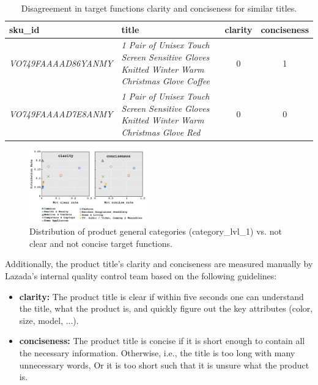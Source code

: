 \documentclass[sigconf]{acmart}
\begin{document}
\begin{table}[t]
\small
\centering
\caption{Disagreement in target functions clarity and conciseness for similar titles.}
\label{tbl:noise}
\begin{tabular}{ll|cc}
\hline
\textbf{sku\_id} & \textbf{title}                                                                & \textbf{clarity} & \textbf{conciseness} \\ \hline
\textit{VO749FAAAAD86YANMY}          & \textit{1 Pair of Unisex Touch Screen Sensitive Gloves Knitted Winter Warm Christmas Glove Coffee} & 0       & 1           \\
\textit{VO749FAAAAD7E8ANMY}          & \textit{1 Pair of Unisex Touch Screen Sensitive Gloves Knitted Winter Warm Christmas Glove Red}    & 0       & 0          \\ \hline
\end{tabular}
\end{table}
\begin{figure}[t]
\centering
\includegraphics[width=0.45\textwidth]{dist_not_clarity_not_concise.png}
\caption{Distribution of product general categories (category\_lvl\_1) vs. not clear and not concise target functions.\label{fig:dist_not_clarity_not_concise}}
\end{figure}
Additionally, the product title's clarity and conciseness are measured manually by Lazada's internal quality control team based on the following guidelines:

\begin{itemize}
    \item \textbf{clarity:} The product title is clear if within five seconds one can understand the title, what the product is, and quickly figure out the key attributes (color, size, model, ...). 
    \item \textbf{conciseness:} The product title is concise if it is short enough to contain all the necessary information. Otherwise, i.e., the title is too long with many unnecessary words, Or it is too short such that it is unsure what the product is.

\end{itemize}
\end{document}
